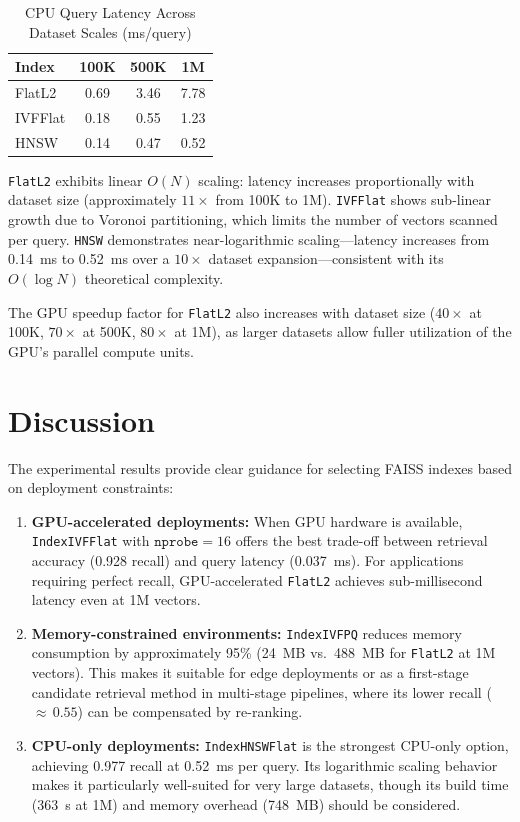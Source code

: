 \documentclass[conference]{IEEEtran}
\begin{document}
\begin{table}[htbp]
\caption{CPU Query Latency Across Dataset Scales (ms/query)}
\label{tab:scalability}
\centering
\begin{tabular}{@{}lccc@{}}
\toprule
\textbf{Index} & \textbf{100K} & \textbf{500K} & \textbf{1M} \\
\midrule
FlatL2  & 0.69 & 3.46 & 7.78 \\
IVFFlat & 0.18 & 0.55 & 1.23 \\
HNSW    & 0.14 & 0.47 & 0.52 \\
\bottomrule
\end{tabular}
\end{table}

\texttt{FlatL2} exhibits linear $O(N)$ scaling: latency increases proportionally with dataset size (approximately $11\times$ from 100K to 1M). \texttt{IVFFlat} shows sub-linear growth due to Voronoi partitioning, which limits the number of vectors scanned per query. \texttt{HNSW} demonstrates near-logarithmic scaling---latency increases from 0.14~ms to 0.52~ms over a $10\times$ dataset expansion---consistent with its $O(\log N)$ theoretical complexity.

The GPU speedup factor for \texttt{FlatL2} also increases with dataset size ($40\times$ at 100K, $70\times$ at 500K, $80\times$ at 1M), as larger datasets allow fuller utilization of the GPU's parallel compute units.

\section{Discussion}
The experimental results provide clear guidance for selecting FAISS indexes based on deployment constraints:

\begin{enumerate}
    \item \textbf{GPU-accelerated deployments:} When GPU hardware is available, \texttt{IndexIVFFlat} with $\texttt{nprobe}=16$ offers the best trade-off between retrieval accuracy (0.928 recall) and query latency (0.037~ms). For applications requiring perfect recall, GPU-accelerated \texttt{FlatL2} achieves sub-millisecond latency even at 1M vectors.
    \item \textbf{Memory-constrained environments:} \texttt{IndexIVFPQ} reduces memory consumption by approximately 95\% (24~MB vs.\ 488~MB for \texttt{FlatL2} at 1M vectors). This makes it suitable for edge deployments or as a first-stage candidate retrieval method in multi-stage pipelines, where its lower recall (${\approx}\,0.55$) can be compensated by re-ranking.
    \item \textbf{CPU-only deployments:} \texttt{IndexHNSWFlat} is the strongest CPU-only option, achieving 0.977 recall at 0.52~ms per query. Its logarithmic scaling behavior makes it particularly well-suited for very large datasets, though its build time (363~s at 1M) and memory overhead (748~MB) should be considered.
\end{enumerate}
\end{document}
